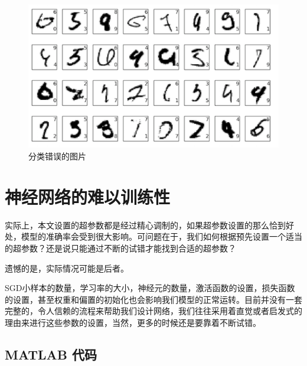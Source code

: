 \documentclass{ctexart}
\numberwithin{equation}{section}    %
\begin{document}
\begin{figure}[H]
    \centering
    \includegraphics[width=0.7\linewidth]{fig/错误}
    \caption{分类错误的图片}
\end{figure}


\section{神经网络的难以训练性}
实际上，本文设置的超参数都是经过精心调制的，如果超参数设置的那么恰到好处，模型的准确率会受到很大影响。可问题在于，我们如何根据预先设置一个适当的超参数？还是说只能通过不断的试错才能找到合适的超参数？

遗憾的是，实际情况可能是后者。

SGD小样本的数量，学习率的大小，神经元的数量，激活函数的设置，损失函数的设置，甚至权重和偏置的初始化也会影响我们模型的正常运转。目前并没有一套完整的，令人信赖的流程来帮助我们设计网络，我们往往采用着直觉或者启发式的理由来进行这些参数的设置，当然，更多的时候还是要靠着不断试错。

\clearpage
\begin{appendices}
\section{MATLAB 代码}

\end{appendices}

\end{document}
